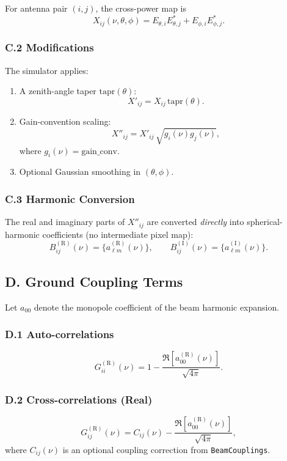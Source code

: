 \documentclass[11pt]{article}
\begin{document}
For antenna pair $(i,j)$, the cross-power map is
\[
X_{ij}(\nu,\theta,\phi)
=
E_{\theta,i}E_{\theta,j}^*
+
E_{\phi,i}E_{\phi,j}^*.
\]

\subsubsection*{C.2 Modifications}

The simulator applies:
\begin{enumerate}
\item A zenith-angle taper $\mathrm{tapr}(\theta)$:
\[
X'_{ij} = X_{ij}\,\mathrm{tapr}(\theta).
\]
\item Gain-convention scaling:
\[
X''_{ij} = X'_{ij}\,\sqrt{g_i(\nu)g_j(\nu)},
\]
where $g_i(\nu)=\mathrm{gain\_conv}$.
\item Optional Gaussian smoothing in $(\theta,\phi)$.
\end{enumerate}

\subsubsection*{C.3 Harmonic Conversion}

The real and imaginary parts of $X''_{ij}$ are converted \emph{directly} into spherical-harmonic coefficients (no intermediate pixel map):
\[
B^{(\mathrm{R})}_{ij}(\nu) = \{ a^{(\mathrm{R})}_{\ell m}(\nu) \},
\qquad
B^{(\mathrm{I})}_{ij}(\nu) = \{ a^{(\mathrm{I})}_{\ell m}(\nu) \}.
\]

\subsection*{D. Ground Coupling Terms}

Let $a_{00}$ denote the monopole coefficient of the beam harmonic expansion.

\subsubsection*{D.1 Auto-correlations}

\[
G^{(\mathrm{R})}_{ii}(\nu)
=
1
-
\frac{\Re\!\left[a^{(\mathrm{R})}_{00}(\nu)\right]}{\sqrt{4\pi}}.
\]

\subsubsection*{D.2 Cross-correlations (Real)}

\[
G^{(\mathrm{R})}_{ij}(\nu)
=
C_{ij}(\nu)
-
\frac{\Re\!\left[a^{(\mathrm{R})}_{00}(\nu)\right]}{\sqrt{4\pi}},
\]
where $C_{ij}(\nu)$ is an optional coupling correction from \texttt{BeamCouplings}.
\end{document}
